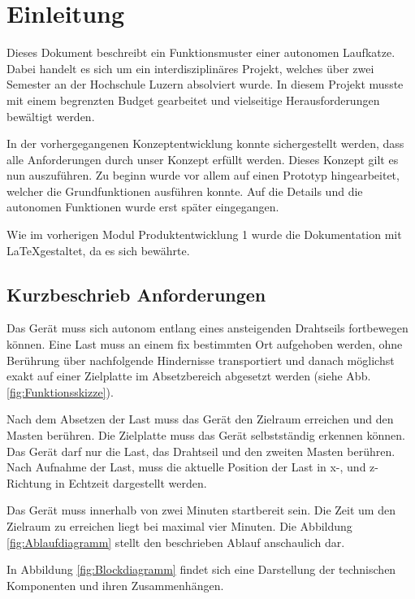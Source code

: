 \documentclass[a4paper]{report}
\begin{document}
\newpage


\chapter{Einleitung}
\label{ch:Intro}
Dieses Dokument beschreibt ein Funktionsmuster einer autonomen Laufkatze. Dabei handelt es sich um ein interdisziplinäres Projekt, welches über zwei Semester an der Hochschule Luzern absolviert wurde. In diesem Projekt musste mit einem begrenzten Budget gearbeitet und vielseitige Herausforderungen bewältigt werden.

In der vorhergegangenen Konzeptentwicklung konnte sichergestellt werden, dass alle Anforderungen durch unser Konzept erfüllt werden. Dieses Konzept gilt es nun auszuführen. Zu beginn wurde vor allem auf einen Prototyp hingearbeitet, welcher die Grundfunktionen ausführen konnte. Auf die Details und die autonomen Funktionen wurde erst später eingegangen.

Wie im vorherigen Modul Produktentwicklung 1 wurde die Dokumentation mit \LaTeX gestaltet, da es sich bewährte.

\section{Kurzbeschrieb Anforderungen}
\label{sec:KurzAnforder}
Das Gerät muss sich autonom entlang eines ansteigenden Drahtseils fortbewegen können. Eine Last muss an einem fix bestimmten Ort aufgehoben werden, ohne Berührung über nachfolgende Hindernisse transportiert und danach möglichst exakt auf einer Zielplatte im Absetzbereich abgesetzt werden (siehe Abb.\ref{fig:Funktionsskizze}).

Nach dem Absetzen der Last muss das Gerät den Zielraum erreichen und den Masten berühren. Die Zielplatte muss das Gerät selbstständig erkennen können. Das Gerät darf nur die Last, das Drahtseil und den zweiten Masten berühren. Nach Aufnahme der Last, muss die aktuelle Position der Last in x-, und z-Richtung in Echtzeit dargestellt werden.

Das Gerät muss innerhalb von zwei Minuten startbereit sein. Die Zeit um den Zielraum zu erreichen liegt bei maximal vier Minuten. Die Abbildung \ref{fig:Ablaufdiagramm} stellt den beschrieben Ablauf anschaulich dar.

In Abbildung \ref{fig:Blockdiagramm} findet sich eine Darstellung der technischen Komponenten und ihren Zusammenhängen.
\end{document}

